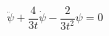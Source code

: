 \begin{equation}
\label{psi}
\ddot{\psi} + \frac{4}{3t}\dot{\psi} - \frac{2}{3t^2}\psi = 0
\end{equation}

